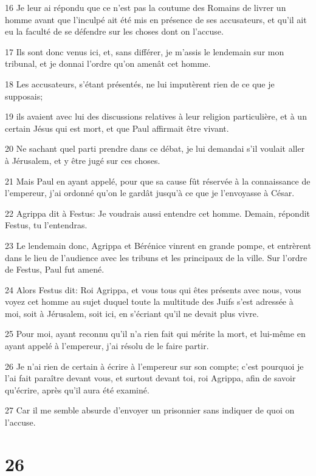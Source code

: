 \par 16 Je leur ai répondu que ce n'est pas la coutume des Romains de livrer un homme avant que l'inculpé ait été mis en présence de ses accusateurs, et qu'il ait eu la faculté de se défendre sur les choses dont on l'accuse.
\par 17 Ils sont donc venus ici, et, sans différer, je m'assis le lendemain sur mon tribunal, et je donnai l'ordre qu'on amenât cet homme.
\par 18 Les accusateurs, s'étant présentés, ne lui imputèrent rien de ce que je supposais;
\par 19 ils avaient avec lui des discussions relatives à leur religion particulière, et à un certain Jésus qui est mort, et que Paul affirmait être vivant.
\par 20 Ne sachant quel parti prendre dans ce débat, je lui demandai s'il voulait aller à Jérusalem, et y être jugé sur ces choses.
\par 21 Mais Paul en ayant appelé, pour que sa cause fût réservée à la connaissance de l'empereur, j'ai ordonné qu'on le gardât jusqu'à ce que je l'envoyasse à César.
\par 22 Agrippa dit à Festus: Je voudrais aussi entendre cet homme. Demain, répondit Festus, tu l'entendras.
\par 23 Le lendemain donc, Agrippa et Bérénice vinrent en grande pompe, et entrèrent dans le lieu de l'audience avec les tribuns et les principaux de la ville. Sur l'ordre de Festus, Paul fut amené.
\par 24 Alors Festus dit: Roi Agrippa, et vous tous qui êtes présents avec nous, vous voyez cet homme au sujet duquel toute la multitude des Juifs s'est adressée à moi, soit à Jérusalem, soit ici, en s'écriant qu'il ne devait plus vivre.
\par 25 Pour moi, ayant reconnu qu'il n'a rien fait qui mérite la mort, et lui-même en ayant appelé à l'empereur, j'ai résolu de le faire partir.
\par 26 Je n'ai rien de certain à écrire à l'empereur sur son compte; c'est pourquoi je l'ai fait paraître devant vous, et surtout devant toi, roi Agrippa, afin de savoir qu'écrire, après qu'il aura été examiné.
\par 27 Car il me semble absurde d'envoyer un prisonnier sans indiquer de quoi on l'accuse.

\chapter{26}

